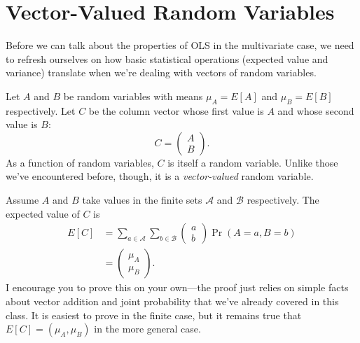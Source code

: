 \documentclass[
  12pt,
  oneside,openany]{book}
\begin{document}
\hypertarget{vector-valued-random-variables}{%
\section{Vector-Valued Random Variables}\label{vector-valued-random-variables}}

Before we can talk about the properties of OLS in the multivariate case, we need to refresh ourselves on how basic statistical operations (expected value and variance) translate when we're dealing with vectors of random variables.

Let \(A\) and \(B\) be random variables with means \(\mu_A = E[A]\) and \(\mu_B = E[B]\) respectively. Let \(C\) be the column vector whose first value is \(A\) and whose second value is \(B\):
\[
C = \begin{pmatrix} A \\ B \end{pmatrix}.
\]
As a function of random variables, \(C\) is itself a random variable. Unlike those we've encountered before, though, it is a \emph{vector-valued} random variable.

Assume \(A\) and \(B\) take values in the finite sets \(\mathcal{A}\) and \(\mathcal{B}\) respectively. The expected value of \(C\) is
\[
\begin{aligned}
E[C]
&= \sum_{a \in \mathcal{A}} \sum_{b \in \mathcal{B}} \begin{pmatrix} a \\ b \end{pmatrix} \Pr(A = a, B = b) \\
&= \begin{pmatrix} \mu_A \\ \mu_B \end{pmatrix}.
\end{aligned}
\]
I encourage you to prove this on your own---the proof just relies on simple facts about vector addition and joint probability that we've already covered in this class. It is easiest to prove in the finite case, but it remains true that \(E[C] = (\mu_A, \mu_B)\) in the more general case.
\end{document}
